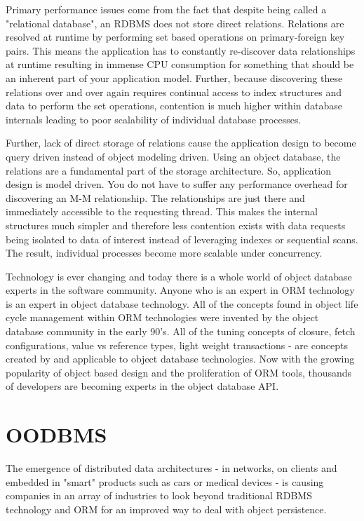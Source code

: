 Primary performance issues come from the fact that despite being called a "relational database", an RDBMS does not store direct relations. Relations are resolved at runtime by performing set based operations on primary-foreign key pairs. This means the application has to constantly re-discover data relationships at runtime resulting in immense CPU consumption for something that should be an inherent part of your application model. Further, because discovering these relations over and over again requires continual access to index structures and data to perform the set operations, contention is much higher within database internals leading to poor scalability of individual database processes.

Further, lack of direct storage of relations cause the application design to become query driven instead of object modeling driven. Using an object database, the relations are a fundamental part of the storage architecture. So, application design is model driven. You do not have to suffer any performance overhead for discovering an M-M relationship. The relationships are just there and immediately accessible to the requesting thread. This makes the internal structures much simpler and therefore less contention exists with data requests being isolated to data of interest instead of leveraging indexes or sequential scans. The result, individual processes become more scalable under concurrency.

Technology is ever changing and today there is a whole world of object database experts in the software community. Anyone who is an expert in ORM technology is an expert in object database technology. All of the concepts found in object life cycle management within ORM technologies were invented by the object database community in the early 90's. All of the tuning concepts of closure, fetch configurations, value vs reference types, light weight transactions - are concepts created by and applicable to object database technologies. Now with the growing popularity of object based design and the proliferation of ORM tools, thousands of developers are becoming experts in the object database API.

\section{OODBMS}
\label{ref:product-philosophy-oodbms}

The emergence of distributed data architectures - in networks, on clients and embedded in "smart" products such as cars or medical devices - is causing companies in an array of industries to look beyond traditional RDBMS technology and ORM for an improved way to deal with object persistence.

